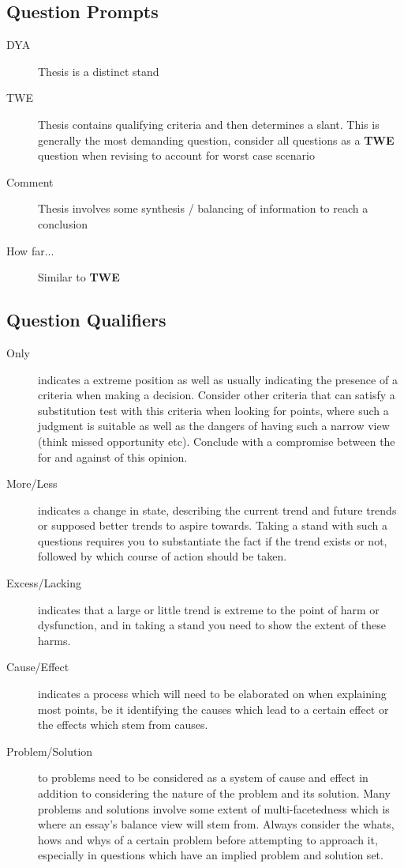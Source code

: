 \documentclass[../../main]{subfiles}
\begin{document}
\subsection{Question Prompts}

\begin{description}
	\item[DYA] Thesis is a distinct stand
	\item[TWE] Thesis contains qualifying criteria and then determines a slant. This is generally the most demanding question, consider all questions as a \textbf{TWE} question when revising to account for worst case scenario
	\item[Comment] Thesis involves some synthesis / balancing of information to reach a conclusion
	\item[How far...] Similar to \textbf{TWE}
\end{description}

\subsection{Question Qualifiers}

\begin{description}
	\item[Only] indicates a extreme position as well as usually indicating the presence of a criteria when making a decision. Consider other criteria that can satisfy a substitution test with this criteria when looking for points, where such a judgment is suitable as well as the dangers of having such a narrow view (think missed opportunity etc). Conclude with a compromise between the for and against of this opinion.
	\item[More/Less] indicates a change in state, describing the current trend and future trends or supposed better trends to aspire towards. Taking a stand with such a questions requires you to substantiate the fact if the trend exists or not, followed by which course of action should be taken.
	\item[Excess/Lacking] indicates that a large or little trend is extreme to the point of harm or dysfunction, and in taking a stand you need to show the extent of these harms.
	\item[Cause/Effect] indicates a process which will need to be elaborated on when explaining most points, be it identifying the causes which lead to a certain effect or the effects which stem from causes.
	\item[Problem/Solution] to problems need to be considered as a system of cause and effect in addition to considering the nature of the problem and its solution. Many problems and solutions involve some extent of multi-facetedness which is where an essay's balance view will stem from. Always consider the whats, hows and whys of a certain problem before attempting to approach it, especially in questions which have an implied problem and solution set.
\end{description}
\end{document}
